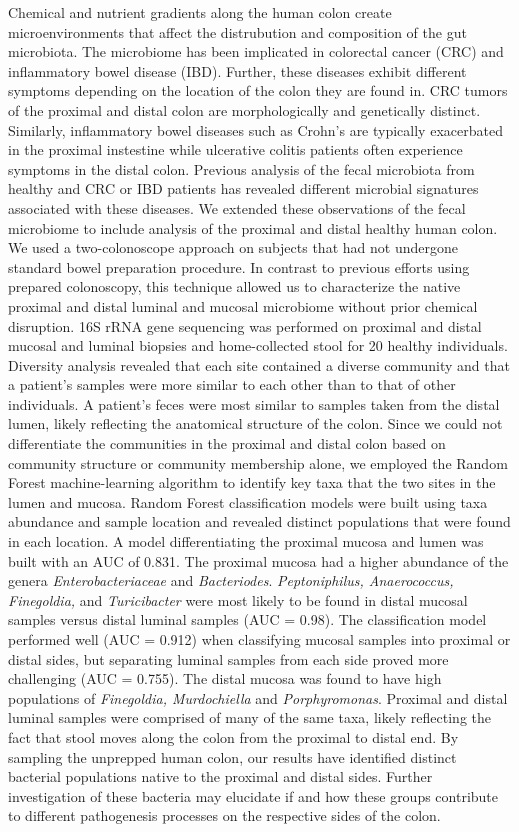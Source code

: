 \documentclass[11pt,]{article}
\begin{document}
Chemical and nutrient gradients along the human colon create
microenvironments that affect the distrubution and composition of the
gut microbiota. The microbiome has been implicated in colorectal cancer
(CRC) and inflammatory bowel disease (IBD). Further, these diseases
exhibit different symptoms depending on the location of the colon they
are found in. CRC tumors of the proximal and distal colon are
morphologically and genetically distinct. Similarly, inflammatory bowel
diseases such as Crohn's are typically exacerbated in the proximal
instestine while ulcerative colitis patients often experience symptoms
in the distal colon. Previous analysis of the fecal microbiota from
healthy and CRC or IBD patients has revealed different microbial
signatures associated with these diseases. We extended these
observations of the fecal microbiome to include analysis of the proximal
and distal healthy human colon. We used a two-colonoscope approach on
subjects that had not undergone standard bowel preparation procedure. In
contrast to previous efforts using prepared colonoscopy, this technique
allowed us to characterize the native proximal and distal luminal and
mucosal microbiome without prior chemical disruption. 16S rRNA gene
sequencing was performed on proximal and distal mucosal and luminal
biopsies and home-collected stool for 20 healthy individuals. Diversity
analysis revealed that each site contained a diverse community and that
a patient's samples were more similar to each other than to that of
other individuals. A patient's feces were most similar to samples taken
from the distal lumen, likely reflecting the anatomical structure of the
colon. Since we could not differentiate the communities in the proximal
and distal colon based on community structure or community membership
alone, we employed the Random Forest machine-learning algorithm to
identify key taxa that the two sites in the lumen and mucosa. Random
Forest classification models were built using taxa abundance and sample
location and revealed distinct populations that were found in each
location. A model differentiating the proximal mucosa and lumen was
built with an AUC of 0.831. The proximal mucosa had a higher abundance
of the genera \emph{Enterobacteriaceae} and \emph{Bacteriodes}.
\emph{Peptoniphilus, Anaerococcus, Finegoldia,} and \emph{Turicibacter}
were most likely to be found in distal mucosal samples versus distal
luminal samples (AUC = 0.98). The classification model performed well
(AUC = 0.912) when classifying mucosal samples into proximal or distal
sides, but separating luminal samples from each side proved more
challenging (AUC = 0.755). The distal mucosa was found to have high
populations of \emph{Finegoldia, Murdochiella} and \emph{Porphyromonas}.
Proximal and distal luminal samples were comprised of many of the same
taxa, likely reflecting the fact that stool moves along the colon from
the proximal to distal end. By sampling the unprepped human colon, our
results have identified distinct bacterial populations native to the
proximal and distal sides. Further investigation of these bacteria may
elucidate if and how these groups contribute to different pathogenesis
processes on the respective sides of the colon.
\end{document}
